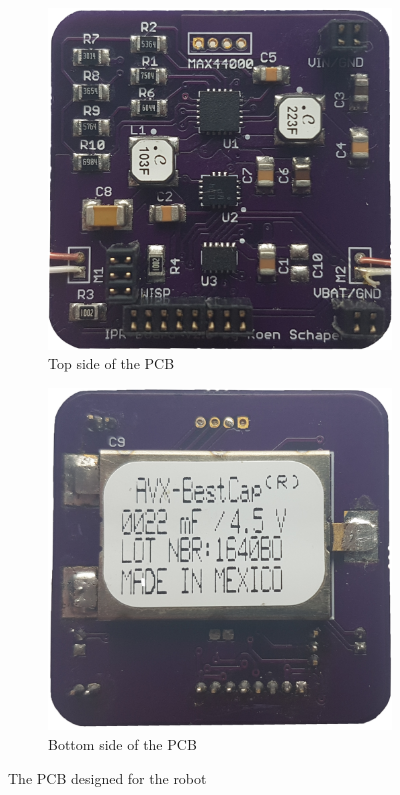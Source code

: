 \begin{figure}[h!]
	\centering
	\begin{subfigure}[b]{0.45\textwidth}
		\includegraphics[width=\textwidth]{pics/pcb_front.jpg}
		\caption{Top side of the PCB}
		\label{fig:pcb_robot_front}
	\end{subfigure}
	\qquad
	\begin{subfigure}[b]{0.45\textwidth}
		\includegraphics[width=\textwidth]{pics/pcb_back.jpg}
		\caption{Bottom side of the PCB}
		\label{fig:pcb_robot_back}
	\end{subfigure}
	\caption{The PCB designed for the robot}
	\label{fig:pcb_robot}
\end{figure}

